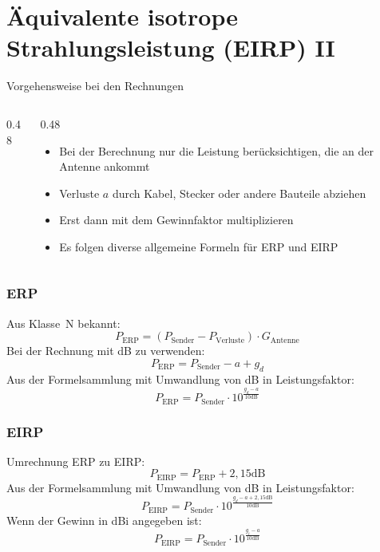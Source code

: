 \section{Äquivalente isotrope Strahlungsleistung (EIRP) II}
\label{section:aequivalente_isotrope_strahlungsleistung_eirp_2}
\begin{frame}{Vorgehensweise bei den Rechnungen}
    \begin{columns}
        \begin{column}{0.48\linewidth}
        \end{column}
        \begin{column}{0.48\linewidth}
            \begin{itemize}
                \item Bei der Berechnung nur die Leistung berücksichtigen, die an der Antenne ankommt
                \item Verluste $a$ durch Kabel, Stecker oder andere Bauteile abziehen
                \item Erst dann mit dem Gewinnfaktor multiplizieren
                \item Es folgen diverse allgemeine Formeln für ERP und EIRP
            \end{itemize}
        \end{column}
    \end{columns}
\end{frame}

\begin{frame}
    \frametitle{ERP}
    Aus Klasse~N bekannt:
    $$P_{\text{ERP}} = (P_{\text{Sender}} - P_{\text{Verluste}}) \cdot G_{\text{Antenne}}$$
    Bei der Rechnung mit dB zu verwenden:
    $$P_{\text{ERP}} = P_{\text{Sender}} - a + g_d$$
    Aus der Formelsammlung mit Umwandlung von dB in Leistungsfaktor:
    $$P_{\text{ERP}} = P_{\text{Sender}} \cdot 10^{\frac{g_d - a}{10\text{dB}}}$$
\end{frame}

\begin{frame}
    \frametitle{EIRP}
    Umrechnung ERP zu EIRP:
    $$P_{\text{EIRP}} = P_{\text{ERP}} + 2,15 \text{dB}$$
    Aus der Formelsammlung mit Umwandlung von dB in Leistungsfaktor:
    $$P_{\text{EIRP}} = P_{\text{Sender}} \cdot 10^{\frac{g_d - a + 2,15\text{dB}}{10\text{dB}}}$$
    Wenn der Gewinn in dBi angegeben ist:
    $$P_{\text{EIRP}} = P_{\text{Sender}} \cdot 10^{\frac{g_i - a}{10\text{dB}}}$$
\end{frame}

